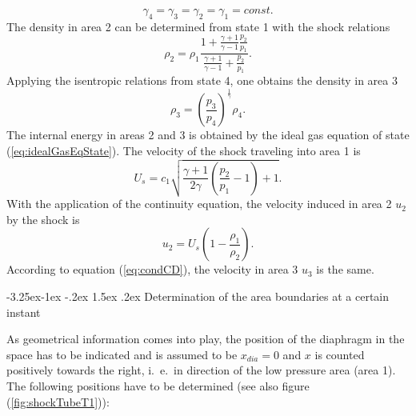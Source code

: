 \documentclass[11pt,a4paper,twoside]{report}
\makeatletter
\renewcommand\paragraph{\@startsection{paragraph}{4}{\z@}%
  {-3.25ex\@plus -1ex \@minus -.2ex}%
  {1.5ex \@plus .2ex}%
  {\normalfont\normalsize\bfseries}}
\makeatother
\begin{document}
\begin{equation}
 \gamma_4= \gamma_3= \gamma_2= \gamma_1=const.
\end{equation}
The density in area 2 can be determined from state 1 with the shock relations 
\begin{equation}
 \rho_2=\rho_1\frac{1+\frac{\gamma+1}{\gamma-1}\frac{p_2}{p_1}}{\frac{\gamma+1}{\gamma-1}+\frac{p_2}{p_1}}.
\end{equation}
Applying the isentropic relations from state 4, one obtains the density in area 3
\begin{equation}
\rho_3=\left(\frac{p_3}{p_4}\right)^{\frac{1}{\gamma}}\rho_4.
\end{equation}
The internal energy in areas 2 and 3 is obtained by the ideal gas equation of state (\ref{eq:idealGasEqState}).
The velocity of the shock traveling into area 1 is
\begin{equation}
\label{eq:shockVelocity}
U_s=c_1\sqrt{\frac{\gamma+1}{2\gamma}\left(\frac{p_2}{p_1}-1\right)+1}.
\end{equation}
With the application of the continuity equation, the velocity induced in area 2 $u_2$ by the shock is
\begin{equation}
 u_2=U_s\left(1-\frac{\rho_1}{\rho_2}\right).
\end{equation}
According to equation (\ref{eq:condCD}), the velocity in area 3 $u_3$ is the same.

\paragraph{Determination of the area boundaries at a certain instant}

As geometrical information comes into play, the position of the diaphragm in the space has to be indicated and is assumed to be $x_{dia}=0$ and $x$ is counted positively towards the right, i.\ e.\ in direction of the low pressure area (area 1).
The following positions have to be determined (see also figure (\ref{fig:shockTubeT1})):
\end{document}
